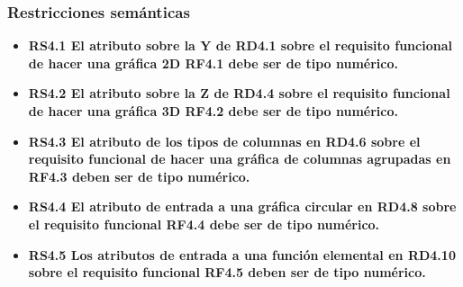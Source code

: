 \subsubsection{Restricciones semánticas}

\begin{itemize}
	\item \textbf{RS4.1 El atributo sobre la Y de RD4.1 sobre el requisito funcional de hacer una gráfica 2D RF4.1 debe ser de tipo numérico.}
	
	\item \textbf{RS4.2 El atributo sobre la Z de RD4.4 sobre el requisito funcional de hacer una gráfica 3D RF4.2 debe ser de tipo numérico.}
	
	\item \textbf{RS4.3 El atributo de los tipos de columnas en RD4.6 sobre el requisito funcional de hacer una gráfica de columnas agrupadas en RF4.3 deben ser de tipo numérico.}
	
	\item \textbf{RS4.4 El atributo de entrada a una gráfica circular en RD4.8 sobre el requisito funcional RF4.4 debe ser de tipo numérico.}
	
	\item \textbf{RS4.5 Los atributos de entrada a una función elemental en RD4.10 sobre el requisito funcional RF4.5 deben ser de tipo numérico.}
	
	
	
\end{itemize}